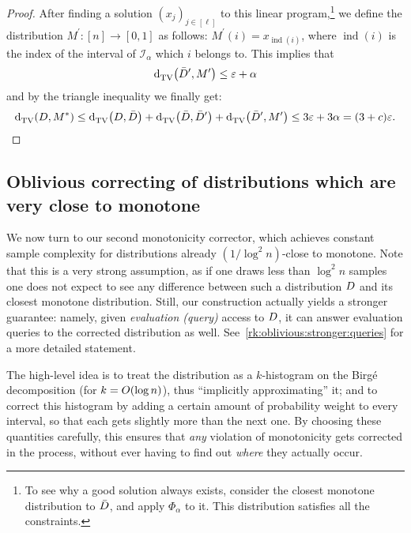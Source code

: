 \begin{proof}
After finding a solution $(x_j)_{j\in[\ell]}$ to this linear program,\footnote{To see why a good solution always exists, consider the closest monotone distribution to $\bar{D}$, and apply $\Phi_{\alpha}$ to it. This distribution satisfies all the constraints.}  we define the distribution $M^\prime\colon[n]\to [0,1]$ as follows: $M^\prime(i)=x_{\operatorname{ind}(i)}$, where $\operatorname{ind}(i)$ is the index of the interval of $\mathcal{I}_\alpha$ which $i$ belongs to. 
This implies that
\begin{equation*}
{\operatorname{d}_{\textrm{TV}}^{}\!\left({\bar{\ensuremath{D}}^\prime, M^\prime}\right)}\leq \varepsilon+\alpha
\end{equation*}
and by the triangle inequality we finally get:
\[ {\operatorname{d}_{\textrm{TV}}^{}\!\left({D, M^\ast}\right)}\leq {\operatorname{d}_{\textrm{TV}}^{}\!\left({\ensuremath{D}, \bar{\ensuremath{D}}}\right)}+{\operatorname{d}_{\textrm{TV}}^{}\!\left({\bar{D}, \bar{D}^\prime}\right)}+{\operatorname{d}_{\textrm{TV}}^{}\!\left({\bar{D}^\prime, M^\prime}\right)}\leq 3\varepsilon+3\alpha = (3+c)\varepsilon. \]
\end{proof}



\subsection{Oblivious correcting of distributions which are very close to monotone}\label{sec:monotonicity:oblivious}


We now turn to our second monotonicity corrector, which achieves constant sample complexity for distributions already $(1/\log^2 n)$-close to monotone. {Note that this is a very strong assumption, as if one draws less than $\log^2 n$ samples one does not expect to see any difference between such a distribution $D$ and its closest monotone distribution. Still, our construction actually yields a stronger guarantee: namely, given \emph{evaluation (query)} access to $D$, it can answer evaluation queries to the corrected distribution as well.} See~\autoref{rk:oblivious:stronger:queries} for a more detailed statement.

The high-level idea is to treat the distribution as a $k$-histogram on the Birg\'e decomposition (for $k=\bigO{\log n}$), thus ``implicitly approximating'' it; and to correct this histogram by adding a certain amount of probability weight to every interval, so that each gets slightly more than the next one. By choosing these quantities carefully, this ensures that \emph{any} violation of monotonicity gets corrected in the process, without ever having to find out \emph{where} they actually occur.\medskip


